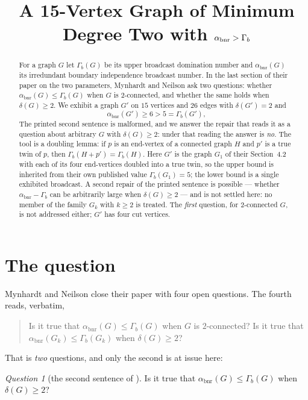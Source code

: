 \documentclass[11pt]{amsart}
\title[Minimum degree two with $\abnr>\Gb$]
{A 15-Vertex Graph of Minimum Degree Two with $\abnr>\Gb$}
\date{}
\theoremstyle{remark}
\newtheorem*{question}{Question}
\DeclareMathOperator{\bnr}{bnr}
\newcommand{\abnr}{\alpha_{\bnr}}
\newcommand{\Gb}{\Gamma_{b}}
\newcommand{\Gp}{G'}
\begin{document}
\begin{abstract}
For a graph $G$ let $\Gb(G)$ be its upper broadcast domination number and
$\abnr(G)$ its irredundant boundary independence broadcast number. In the last
section of their paper on the two parameters, Mynhardt and Neilson ask two
questions: whether $\abnr(G)\le\Gb(G)$ when $G$ is $2$-connected, and whether
the same holds when $\delta(G)\ge2$. We exhibit a graph $\Gp$ on $15$ vertices
and $26$ edges with $\delta(\Gp)=2$ and
\[
 \abnr(\Gp)\ge6>5=\Gb(\Gp),
\]
The printed second sentence is malformed, and we answer the repair that reads it
as a question about arbitrary $G$ with $\delta(G)\ge2$: under that reading the
answer is \emph{no}. The tool is a doubling lemma: if $p$ is an end-vertex of a
connected graph $H$ and $p'$ is a true twin of $p$, then $\Gb(H+p')=\Gb(H)$.
Here $\Gp$ is the graph $G_1$ of their Section~4.2 with each of its four
end-vertices doubled into a true twin, so the upper bound is inherited from
their own published value $\Gb(G_1)=5$; the lower bound is a single exhibited
broadcast. A second repair of the printed sentence is possible --- whether
$\abnr-\Gb$ can be arbitrarily large when $\delta(G)\ge2$ --- and is not
settled here: no member of the family $G_k$ with $k\ge2$ is treated. The
\emph{first} question, for $2$-connected $G$, is not addressed either; $\Gp$ has
four cut vertices.
\end{abstract}

\maketitle

\section{The question}

Mynhardt and Neilson \cite{MN24} close their paper with four open questions. The
fourth reads, verbatim,

\begin{quote}
Is it true that $\abnr(G)\le\Gb(G)$ when $G$ is $2$-connected? Is it true that
$\abnr(G_k)\le\Gb(G_k)$ when $\delta(G)\ge2$?
\end{quote}

\noindent
That is \emph{two} questions, and only the second is at issue here:

\begin{question}[the second sentence of {\cite[Question~4]{MN24}}]
Is it true that $\abnr(G)\le\Gb(G)$ when $\delta(G)\ge2$?
\end{question}
\end{document}
